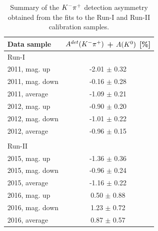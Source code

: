 \begin{table}[h]
\centering
 \begin{tabular}{l c}
 \hline
 \hline
Data sample & $A^{det}({{K}^-}{{\pi}^+})$ + $A({{K}^0})$ [\%] \\
\hline
Run-I & \\ 
2011, mag. up & -2.01 $\pm$ 0.32\\
2011, mag. down &  -0.16 $\pm$  0.28\\
2011, average & -1.09 $\pm$ 0.21\\

2012, mag. up &  -0.90 $\pm$ 0.20\\
2012, mag. down & -1.01 $\pm$ 0.22 \\
2012, average & -0.96 $\pm$ 0.15\\
\\
Run-II & \\ 
2015, mag. up & -1.36 $\pm$ 0.36 \\
2015, mag. down & -0.96 $\pm$ 0.24 \\
2015, average & -1.16 $\pm$ 0.22\\
2016, mag. up &  0.50 $\pm$ 0.88\\
2016, mag. down & 1.23 $\pm$ 0.72 \\
2016, average & 0.87 $\pm$ 0.57\\
\hline
\hline
\end{tabular}
\caption{Summary of the ${{K}^-}{{\pi}^+}$ detection asymmetry obtained from the fits to the Run-I and Run-II calibration samples.}
\label{table:KpiDetectionAsym}
\end{table}
